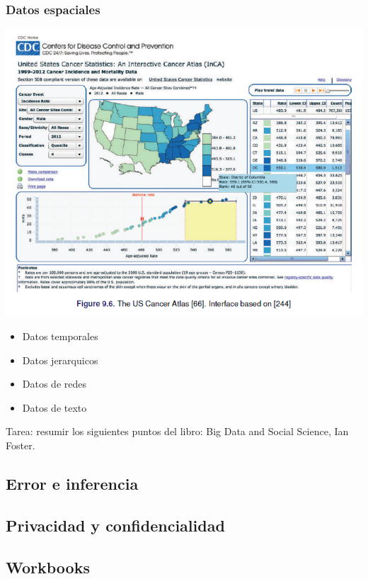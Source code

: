\documentclass[
]{book}
\providecommand{\tightlist}{%
  \setlength{\itemsep}{0pt}\setlength{\parskip}{0pt}}
\begin{document}
\hypertarget{datos-espaciales}{%
\subsubsection{Datos espaciales}\label{datos-espaciales}}

\includegraphics{images/bd12.PNG}

\begin{itemize}
\tightlist
\item
  Datos temporales
\item
  Datos jerarquicos
\item
  Datos de redes
\item
  Datos de texto
\end{itemize}

Tarea: resumir los siguientes puntos del libro: Big Data and Social Science, Ian Foster.

\hypertarget{error-e-inferencia}{%
\subsection{Error e inferencia}\label{error-e-inferencia}}

\hypertarget{privacidad-y-confidencialidad}{%
\subsection{Privacidad y confidencialidad}\label{privacidad-y-confidencialidad}}

\hypertarget{workbooks}{%
\subsection{Workbooks}\label{workbooks}}
\end{document}
